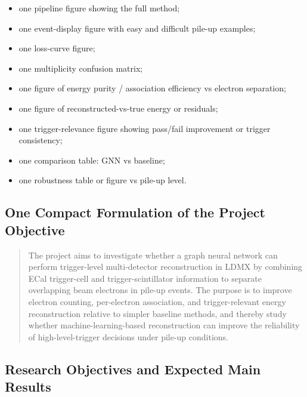 \begin{itemize}
    \item one pipeline figure showing the full method;
    \item one event-display figure with easy and difficult pile-up examples;
    \item one loss-curve figure;
    \item one multiplicity confusion matrix;
    \item one figure of energy purity / association efficiency vs electron separation;
    \item one figure of reconstructed-vs-true energy or residuals;
    \item one trigger-relevance figure showing pass/fail improvement or trigger consistency;
    \item one comparison table: GNN vs baseline;
    \item one robustness table or figure vs pile-up level.
\end{itemize}

\subsection{One Compact Formulation of the Project Objective}

\begin{quote}
The project aims to investigate whether a graph neural network can perform trigger-level
multi-detector reconstruction in LDMX by combining ECal trigger-cell and trigger-scintillator
information to separate overlapping beam electrons in pile-up events. The purpose is to
improve electron counting, per-electron association, and trigger-relevant energy reconstruction
relative to simpler baseline methods, and thereby study whether machine-learning-based
reconstruction can improve the reliability of high-level-trigger decisions under pile-up
conditions.
\end{quote}


\newpage



\subsection{Research Objectives and Expected Main Results}


